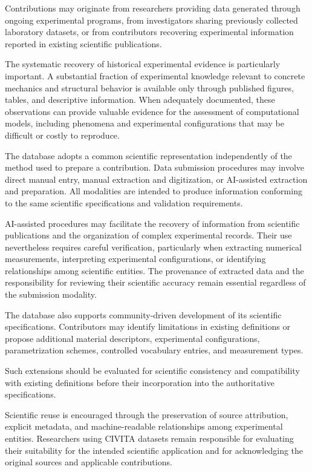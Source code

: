 Contributions may originate from researchers providing
data generated through ongoing experimental programs,
from investigators sharing previously collected
laboratory datasets, or from contributors recovering
experimental information reported in existing scientific
publications.

The systematic recovery of historical experimental
evidence is particularly important. A substantial
fraction of experimental knowledge relevant to concrete
mechanics and structural behavior is available only
through published figures, tables, and descriptive
information. When adequately documented, these
observations can provide valuable evidence for the
assessment of computational models, including
phenomena and experimental configurations that
may be difficult or costly to reproduce.

The database adopts a common scientific representation
independently of the method used to prepare a contribution.
Data submission procedures may involve direct manual
entry, manual extraction and digitization, or
AI-assisted extraction and preparation. All modalities
are intended to produce information conforming to
the same scientific specifications and validation
requirements.

AI-assisted procedures may facilitate the recovery
of information from scientific publications and the
organization of complex experimental records. Their
use nevertheless requires careful verification,
particularly when extracting numerical measurements,
interpreting experimental configurations, or identifying
relationships among scientific entities. The provenance
of extracted data and the responsibility for reviewing
their scientific accuracy remain essential regardless
of the submission modality.

The database also supports community-driven development
of its scientific specifications. Contributors may
identify limitations in existing definitions or
propose additional material descriptors, experimental
configurations, parametrization schemes, controlled
vocabulary entries, and measurement types.

Such extensions should be evaluated for scientific
consistency and compatibility with existing definitions
before their incorporation into the authoritative
specifications.

Scientific reuse is encouraged through the preservation
of source attribution, explicit metadata, and
machine-readable relationships among experimental
entities. Researchers using CIVITA datasets remain
responsible for evaluating their suitability for
the intended scientific application and for
acknowledging the original sources and applicable
contributions.

